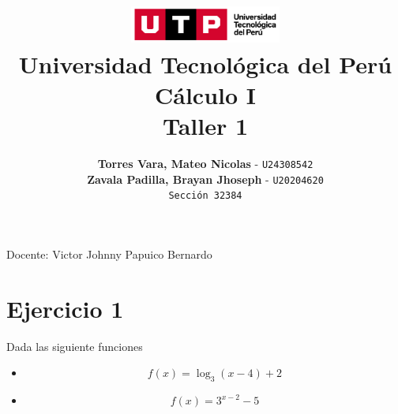 \documentclass[12pt]{article}
\title{
  \vspace{2cm}
  \pagenumbering{gobble}
  \includegraphics[width=5cm]{./assets/logo-utp.png} \\
  \vspace{1cm}
  \textbf{Universidad Tecnológica del Perú} \\
  \vspace{2cm}
  \textbf{Cálculo I} \\
  \vspace{1cm}
  \large \textbf{Taller 1}
}
\author{
  \textbf{Torres Vara, Mateo Nicolas} - \texttt{U24308542} \\
  \textbf{Zavala Padilla, Brayan Jhoseph} - \texttt{U20204620} \\
  \texttt{Sección 32384}
}
\begin{document}
\maketitle
\begin{center}

  Docente: Victor Johnny Papuico Bernardo

\end{center}

%
%

\newpage
\section*{Ejercicio 1}
Dada las siguiente funciones
\begin{itemize}
  \item \[ f(x) = \log_3(x-4)+2 \]
  \item \[ f(x) = 3^{x-2}-5 \]
\end{itemize}
\end{document}
